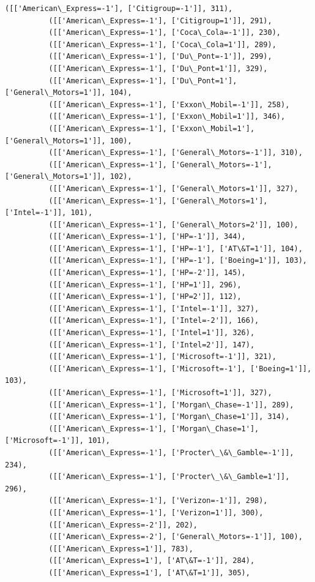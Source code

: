 \documentclass[11pt]{article}
\begin{document}
\begin{Verbatim}[commandchars=\\\{\}]
          ([['American\_Express=-1'], ['Citigroup=-1']], 311),
          ([['American\_Express=-1'], ['Citigroup=1']], 291),
          ([['American\_Express=-1'], ['Coca\_Cola=-1']], 230),
          ([['American\_Express=-1'], ['Coca\_Cola=1']], 289),
          ([['American\_Express=-1'], ['Du\_Pont=-1']], 299),
          ([['American\_Express=-1'], ['Du\_Pont=1']], 329),
          ([['American\_Express=-1'], ['Du\_Pont=1'], ['General\_Motors=1']], 104),
          ([['American\_Express=-1'], ['Exxon\_Mobil=-1']], 258),
          ([['American\_Express=-1'], ['Exxon\_Mobil=1']], 346),
          ([['American\_Express=-1'], ['Exxon\_Mobil=1'], ['General\_Motors=1']], 100),
          ([['American\_Express=-1'], ['General\_Motors=-1']], 310),
          ([['American\_Express=-1'], ['General\_Motors=-1'], ['General\_Motors=1']], 102),
          ([['American\_Express=-1'], ['General\_Motors=1']], 327),
          ([['American\_Express=-1'], ['General\_Motors=1'], ['Intel=-1']], 101),
          ([['American\_Express=-1'], ['General\_Motors=2']], 100),
          ([['American\_Express=-1'], ['HP=-1']], 344),
          ([['American\_Express=-1'], ['HP=-1'], ['AT\&T=1']], 104),
          ([['American\_Express=-1'], ['HP=-1'], ['Boeing=1']], 103),
          ([['American\_Express=-1'], ['HP=-2']], 145),
          ([['American\_Express=-1'], ['HP=1']], 296),
          ([['American\_Express=-1'], ['HP=2']], 112),
          ([['American\_Express=-1'], ['Intel=-1']], 327),
          ([['American\_Express=-1'], ['Intel=-2']], 166),
          ([['American\_Express=-1'], ['Intel=1']], 326),
          ([['American\_Express=-1'], ['Intel=2']], 147),
          ([['American\_Express=-1'], ['Microsoft=-1']], 321),
          ([['American\_Express=-1'], ['Microsoft=-1'], ['Boeing=1']], 103),
          ([['American\_Express=-1'], ['Microsoft=1']], 327),
          ([['American\_Express=-1'], ['Morgan\_Chase=-1']], 289),
          ([['American\_Express=-1'], ['Morgan\_Chase=1']], 314),
          ([['American\_Express=-1'], ['Morgan\_Chase=1'], ['Microsoft=-1']], 101),
          ([['American\_Express=-1'], ['Procter\_\&\_Gamble=-1']], 234),
          ([['American\_Express=-1'], ['Procter\_\&\_Gamble=1']], 296),
          ([['American\_Express=-1'], ['Verizon=-1']], 298),
          ([['American\_Express=-1'], ['Verizon=1']], 300),
          ([['American\_Express=-2']], 202),
          ([['American\_Express=-2'], ['General\_Motors=-1']], 100),
          ([['American\_Express=1']], 783),
          ([['American\_Express=1'], ['AT\&T=-1']], 284),
          ([['American\_Express=1'], ['AT\&T=1']], 305),

\end{Verbatim}
\end{document}
